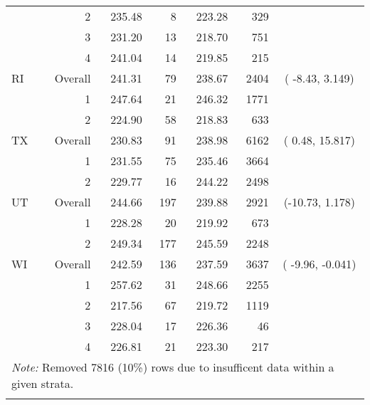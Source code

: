 \begin{longtable}{lrrr@{\extracolsep{.25cm}}rrc}
   & 2 & 235.48 &   8 & 223.28 & 329 &  \\ 
   & 3 & 231.20 &  13 & 218.70 & 751 &  \\ 
   & 4 & 241.04 &  14 & 219.85 & 215 &  \\ 
   \hline
RI & Overall & 241.31 &  79 & 238.67 & 2404 & ( -8.43,  3.149) \\ 
   & 1 & 247.64 &  21 & 246.32 & 1771 &  \\ 
   & 2 & 224.90 &  58 & 218.83 & 633 &  \\ 
   \hline
TX & Overall & 230.83 &  91 & 238.98 & 6162 & (  0.48, 15.817) \\ 
   & 1 & 231.55 &  75 & 235.46 & 3664 &  \\ 
   & 2 & 229.77 &  16 & 244.22 & 2498 &  \\ 
   \hline
UT & Overall & 244.66 & 197 & 239.88 & 2921 & (-10.73,  1.178) \\ 
   & 1 & 228.28 &  20 & 219.92 & 673 &  \\ 
   & 2 & 249.34 & 177 & 245.59 & 2248 &  \\ 
   \hline
WI & Overall & 242.59 & 136 & 237.59 & 3637 & ( -9.96, -0.041) \\ 
   & 1 & 257.62 &  31 & 248.66 & 2255 &  \\ 
   & 2 & 217.56 &  67 & 219.72 & 1119 &  \\ 
   & 3 & 228.04 &  17 & 226.36 &  46 &  \\ 
   & 4 & 226.81 &  21 & 223.30 & 217 &  \\ 
   \hline \multicolumn{7}{l}{\textit{Note:} Removed 7816 (10\%) rows due to insufficent data within a given strata.} \\\hline
\label{g4math-mlpsa-ctree}
\end{longtable}
